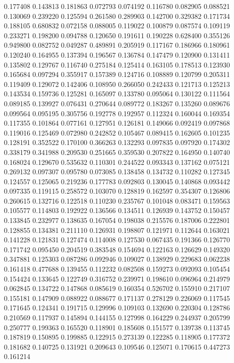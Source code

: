 0.177408
0.143813
0.181863
0.072793
0.074192
0.116780
0.082905
0.088521
0.130069
0.239220
0.125594
0.261580
0.289903
0.142700
0.329382
0.171734
0.188105
0.680832
0.072158
0.088005
0.119022
0.100879
0.087574
0.109119
0.233271
0.198200
0.094788
0.120650
0.191611
0.190228
0.628400
0.355126
0.949800
0.082752
0.049287
0.489891
0.205919
0.117167
0.186966
0.180961
0.120240
0.164955
0.137394
0.196567
0.136784
0.147479
0.120900
0.131411
0.135802
0.129767
0.116740
0.275184
0.125414
0.163105
0.178513
0.123930
0.165684
0.097294
0.355917
0.157389
0.124716
0.108889
0.120799
0.205311
0.119409
0.129072
0.142406
0.108950
0.266050
0.242433
0.121713
0.125213
0.143534
0.159736
0.125281
0.165097
0.133780
0.095064
0.130122
0.111564
0.089185
0.139927
0.076431
0.270644
0.089772
0.183267
0.135260
0.089676
0.099564
0.095195
0.305756
0.192778
0.192957
0.112324
0.160044
0.169354
0.117355
0.101864
0.077161
0.127951
0.126181
0.149066
0.092419
0.097868
0.119016
0.125469
0.072980
0.242852
0.105467
0.089415
0.162605
0.101235
0.128191
0.352522
0.170100
0.366263
0.132293
0.097835
0.097920
0.174302
0.338179
0.341988
0.209530
0.251665
0.359530
0.207822
0.164950
0.140740
0.168024
0.129670
0.535632
0.110301
0.244522
0.093343
0.137162
0.075121
0.269132
0.097307
0.095780
0.073085
0.138458
0.134732
0.110282
0.127345
0.124557
0.125065
0.219236
0.177783
0.092803
0.130045
0.140868
0.093442
0.097335
0.119115
0.258572
0.103070
0.128819
0.162597
0.354307
0.126806
0.260615
0.132716
0.122518
0.110230
0.235767
0.101048
0.083471
0.159563
0.105577
0.114803
0.192922
0.136566
0.134511
0.126939
0.143752
0.150457
0.133845
0.232977
0.138635
0.167054
0.198038
0.215576
0.187006
0.222801
0.128855
0.134381
0.211110
0.126931
0.198807
0.121971
0.112644
0.163021
0.141228
0.121831
0.127474
0.114008
0.127530
0.067435
0.191366
0.126770
0.171742
0.095450
0.204519
0.383548
0.154694
0.122163
0.126629
0.149320
0.347881
0.125303
0.087286
0.092946
0.109027
0.138929
0.229683
0.062238
0.161418
0.477688
0.139455
0.112232
0.082508
0.159273
0.092093
0.105454
0.154424
0.133645
0.122749
0.316752
0.239971
0.198610
0.096964
0.214979
0.062845
0.134722
0.147868
0.085619
0.160354
0.526702
0.155910
0.217107
0.155181
0.147909
0.088922
0.088677
0.171137
0.278129
0.226069
0.117545
0.171645
0.124341
0.191715
0.129996
0.109103
0.132690
0.220304
0.128786
0.210569
0.117937
0.145894
0.144155
0.127998
0.164229
0.244937
0.205799
0.250777
0.199363
0.165520
0.118901
0.185608
0.151577
0.139738
0.113745
0.187819
0.150895
0.199885
0.122915
0.273139
0.122285
0.118905
0.177372
0.181682
0.140725
0.131921
0.209643
0.109546
0.125071
0.170615
0.447273
0.161214
